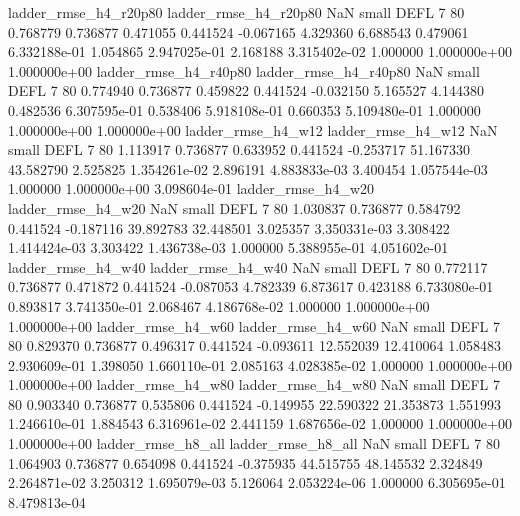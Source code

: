    ladder_rmse_h4_r20p80    ladder_rmse_h4_r20p80                   NaN      small     DEFL                 7 80 0.768779       0.736877 0.471055       0.441524   -0.067165      4.329360      6.688543     0.479061   6.332188e-01  1.054865 2.947025e-01     2.168188   3.315402e-02            1.000000    1.000000e+00        1.000000e+00
   ladder_rmse_h4_r40p80    ladder_rmse_h4_r40p80                   NaN      small     DEFL                 7 80 0.774940       0.736877 0.459822       0.441524   -0.032150      5.165527      4.144380     0.482536   6.307595e-01  0.538406 5.918108e-01     0.660353   5.109480e-01            1.000000    1.000000e+00        1.000000e+00
      ladder_rmse_h4_w12       ladder_rmse_h4_w12                   NaN      small     DEFL                 7 80 1.113917       0.736877 0.633952       0.441524   -0.253717     51.167330     43.582790     2.525825   1.354261e-02  2.896191 4.883833e-03     3.400454   1.057544e-03            1.000000    1.000000e+00        3.098604e-01
      ladder_rmse_h4_w20       ladder_rmse_h4_w20                   NaN      small     DEFL                 7 80 1.030837       0.736877 0.584792       0.441524   -0.187116     39.892783     32.448501     3.025357   3.350331e-03  3.308422 1.414424e-03     3.303422   1.436738e-03            1.000000    5.388955e-01        4.051602e-01
      ladder_rmse_h4_w40       ladder_rmse_h4_w40                   NaN      small     DEFL                 7 80 0.772117       0.736877 0.471872       0.441524   -0.087053      4.782339      6.873617     0.423188   6.733080e-01  0.893817 3.741350e-01     2.068467   4.186768e-02            1.000000    1.000000e+00        1.000000e+00
      ladder_rmse_h4_w60       ladder_rmse_h4_w60                   NaN      small     DEFL                 7 80 0.829370       0.736877 0.496317       0.441524   -0.093611     12.552039     12.410064     1.058483   2.930609e-01  1.398050 1.660110e-01     2.085163   4.028385e-02            1.000000    1.000000e+00        1.000000e+00
      ladder_rmse_h4_w80       ladder_rmse_h4_w80                   NaN      small     DEFL                 7 80 0.903340       0.736877 0.535806       0.441524   -0.149955     22.590322     21.353873     1.551993   1.246610e-01  1.884543 6.316961e-02     2.441159   1.687656e-02            1.000000    1.000000e+00        1.000000e+00
      ladder_rmse_h8_all       ladder_rmse_h8_all                   NaN      small     DEFL                 7 80 1.064903       0.736877 0.654098       0.441524   -0.375935     44.515755     48.145532     2.324849   2.264871e-02  3.250312 1.695079e-03     5.126064   2.053224e-06            1.000000    6.305695e-01        8.479813e-04
